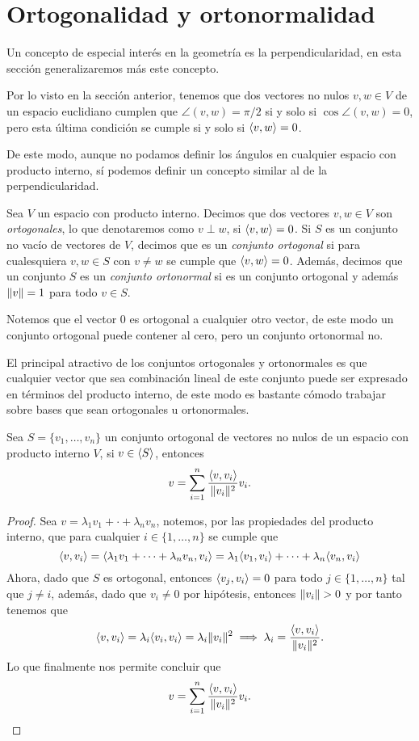 \section{Ortogonalidad y ortonormalidad}

Un concepto de especial interés en la geometría es la perpendicularidad, en esta sección generalizaremos más este concepto.

Por lo visto en la sección anterior, tenemos que dos vectores no nulos $v,w \in V$ de un espacio euclidiano cumplen que $\angle(v,w) = \pi/2$ si y solo si $\cos \angle(v,w) = 0$, pero esta última condición se cumple si y solo si $\langle v,w\rangle = 0$.

De este modo, aunque no podamos definir los ángulos en cualquier espacio con producto interno, sí podemos definir un concepto similar al de la perpendicularidad.

\begin{defi}
  Sea $V$ un espacio con producto interno. Decimos que dos vectores $v,w \in V$ son \emph{ortogonales}, lo que denotaremos como $v\perp w$, si $\langle v,w\rangle = 0$. Si $S$ es un conjunto no vacío de vectores de $V$, decimos que es un \emph{conjunto ortogonal} si para cualesquiera $v,w \in S$ con $v \neq w$ se cumple que $\langle v,w\rangle = 0$. Además, decimos que un conjunto $S$ es un \emph{conjunto ortonormal} si es un conjunto ortogonal y además $\mathopen\|v\mathclose\| = 1$ para todo $v \in S$.
\end{defi}

Notemos que el vector $0$ es ortogonal a cualquier otro vector, de este modo un conjunto ortogonal puede contener al cero, pero un conjunto ortonormal no.

El principal atractivo de los conjuntos ortogonales y ortonormales es que cualquier vector que sea combinación lineal de este conjunto puede ser expresado en términos del producto interno, de este modo es bastante cómodo trabajar sobre bases que sean ortogonales u ortonormales.

\begin{teor} \label{teor:ExoFourier}
  Sea $S = \{v_1, \ldots, v_n\}$ un conjunto ortogonal de vectores no nulos de un espacio con producto interno $V$, si $v \in \langle S\rangle$, entonces
    \[
      v = \sum_{i=1}^n \frac{\langle v,v_i\rangle}{\mathopen\|v_i\mathclose\|^2} v_i.
    \]
\end{teor}

\begin{proof}
  Sea $v = \lambda_1 v_1 + \cdot + \lambda_n v_n$, notemos, por las propiedades del producto interno, que para cualquier $i \in \{1,\ldots,n\}$ se cumple que
  \[
    \langle v,v_i\rangle = \langle\lambda_1 v_1 + \cdots + \lambda_n v_n,v_i\rangle 
      = \lambda_1 \langle v_1,v_i\rangle + \cdots + \lambda_n \langle v_n,v_i\rangle
  \]
  Ahora, dado que $S$ es ortogonal, entonces $\langle v_j, v_i\rangle = 0$ para todo $j \in \{1,\ldots,n\}$ tal que $j \neq i$, además, dado que $v_i \neq 0$ por hipótesis, entonces $\mathopen\|v_i\mathclose\| > 0$ y por tanto tenemos que
  \[
    \langle v,v_i\rangle = \lambda_i \langle v_i,v_i\rangle = \lambda_i \mathopen\|v_i\mathclose\|^2 \implies \lambda_i = \frac{\langle v,v_i\rangle}{\mathopen\|v_i\mathclose\|^2}.
  \]
  Lo que finalmente nos permite concluir que 
    \[
      v = \sum_{i=1}^n \frac{\langle v,v_i\rangle}{\mathopen\|v_i\mathclose\|^2} v_i. \qedhere
    \]
\end{proof}

